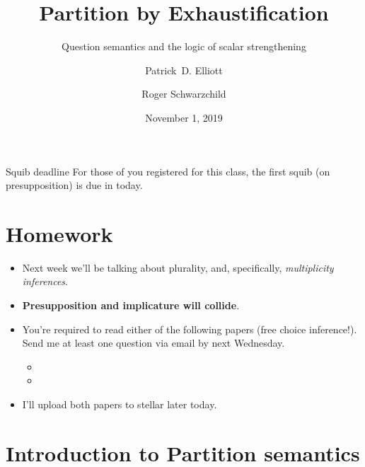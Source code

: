 \documentclass[portrait,cronos,paper=letter]{ling-handout}
\title{Partition by Exhaustification}
\subtitle{Question semantics and the logic of scalar strengthening}
\date{November 1, 2019}
\author{Patrick~D. Elliott
  \and
Roger Schwarzchild}
\begin{document}
\maketitle

\begin{tcolorbox}
  Squib deadline
  \tcblower
  For those of you registered for this class, the first squib (on
  presupposition) is due in today.
\end{tcolorbox}

\section*{Homework}

\begin{itemize}

    \item Next week we'll be talking about plurality, and, specifically,
    \textit{multiplicity inferences}.

    \item \textbf{Presupposition and implicature will collide}.

    \item You're required to read either of the following papers (free choice
    inference!). Send me at least one question via email by next Wednesday.

    \begin{itemize}

        \item {}

        \item {}

    \end{itemize}

    \item I'll upload both papers to stellar later today.

\end{itemize}

\section{Introduction to Partition semantics}
\end{document}
